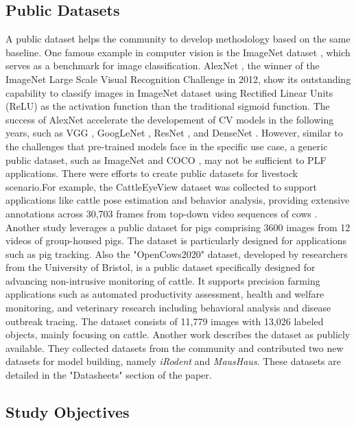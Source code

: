 \subsection*{Public Datasets}

A public dataset helps the community to develop methodology based on the same baseline. One famous example in computer vision is the ImageNet dataset \cite{deng2009imagenet}, which serves as a benchmark for image classification. AlexNet \cite{krizhevsky2017imagenet}, the winner of the ImageNet Large Scale Visual Recognition Challenge in 2012, show its outstanding capability to classify images in ImageNet dataset using Rectified Linear Units (ReLU) as the activation function than the traditional sigmoid function. The success of AlexNet accelerate the developement of CV models in the following years, such as VGG \cite{karen2014very}, GoogLeNet \cite{szegedy2015going}, ResNet \cite{targ2016resnet}, and DenseNet \cite{huang2017densely}. However, similar to the challenges that pre-trained models face in the specific use case, a generic public dataset, such as ImageNet \cite{deng2009imagenet}and COCO \cite{lin2014microsoft}, may not be sufficient to PLF applications. There  were efforts to create public datasets for livestock scenario.For example, the CattleEyeView dataset was collected to support applications like cattle pose estimation and behavior analysis, providing extensive annotations across 30,703 frames from top-down video sequences of cows \cite{ong2023cattleeyeview}.
Another study \cite{t2020long} leverages a public dataset for pigs comprising 3600 images from 12 videos of group-housed pigs. The dataset is particularly designed for applications such as pig tracking. Also the "OpenCows2020" dataset, developed by researchers from the University of Bristol, is a public dataset specifically designed for advancing non-intrusive monitoring of cattle. It supports precision farming applications such as automated productivity assessment, health and welfare monitoring, and veterinary research including behavioral analysis and disease outbreak tracing. The dataset consists of 11,779 images with 13,026 labeled objects, mainly focusing on cattle\cite{visualization-tools-for-opencows2020-dataset}.
Another work \cite{ye2022superanimal} describes the dataset as publicly available. They collected datasets from the community and contributed two new datasets for model building, namely \textit{iRodent} and \textit{MausHaus}. These datasets are detailed in the "Datasheets" section of the paper.

\subsection*{Study Objectives}

